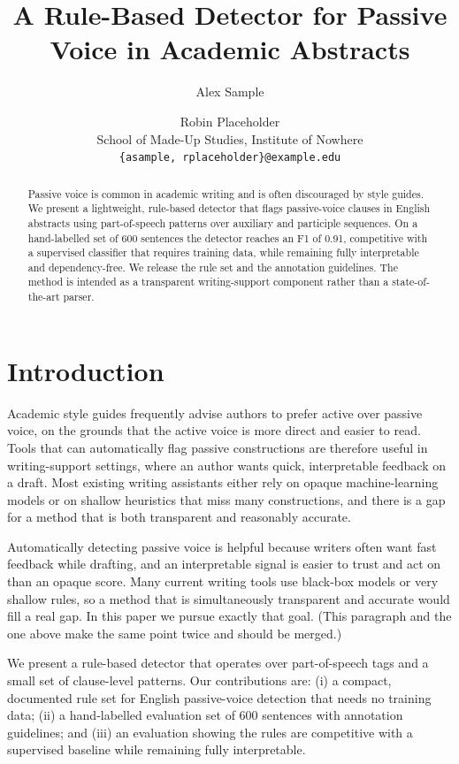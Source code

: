 \documentclass[11pt]{article}
\title{A Rule-Based Detector for Passive Voice in Academic Abstracts}
\author{Alex Sample \and Robin Placeholder \\ School of Made-Up Studies, Institute of Nowhere \\ \texttt{\{asample, rplaceholder\}@example.edu}}
\date{}
\begin{document}
\maketitle

\begin{abstract}
Passive voice is common in academic writing and is often discouraged by style
guides. We present a lightweight, rule-based detector that flags passive-voice
clauses in English abstracts using part-of-speech patterns over auxiliary and
participle sequences. On a hand-labelled set of 600 sentences the detector
reaches an F1 of 0.91, competitive with a supervised classifier that requires
training data, while remaining fully interpretable and dependency-free. We
release the rule set and the annotation guidelines. The method is intended as a
transparent writing-support component rather than a state-of-the-art parser.
\end{abstract}

\section{Introduction}

Academic style guides frequently advise authors to prefer active over passive
voice, on the grounds that the active voice is more direct and easier to read.
Tools that can automatically flag passive constructions are therefore useful in
writing-support settings, where an author wants quick, interpretable feedback on
a draft. Most existing writing assistants either rely on opaque machine-learning
models or on shallow heuristics that miss many constructions, and there is a gap
for a method that is both transparent and reasonably accurate.

Automatically detecting passive voice is helpful because writers often want fast
feedback while drafting, and an interpretable signal is easier to trust and act
on than an opaque score. Many current writing tools use black-box models or very
shallow rules, so a method that is simultaneously transparent and accurate would
fill a real gap. In this paper we pursue exactly that goal. (This paragraph and
the one above make the same point twice and should be merged.)

We present a rule-based detector that operates over part-of-speech tags and a
small set of clause-level patterns. Our contributions are: (i) a compact,
documented rule set for English passive-voice detection that needs no training
data; (ii) a hand-labelled evaluation set of 600 sentences with annotation
guidelines; and (iii) an evaluation showing the rules are competitive with a
supervised baseline while remaining fully interpretable.
\end{document}
